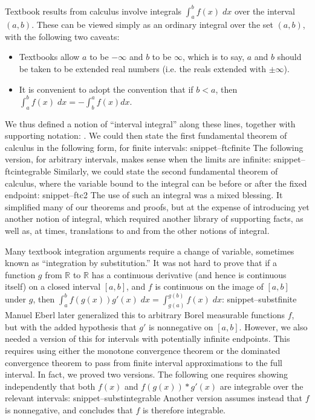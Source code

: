 \documentclass{svjour3}
\newcommand{\RR}{\mathbb{R}}
\newcommand{\Snippet}[1]{\csname snippet--#1\endcsname}
\begin{document}
Textbook results from calculus involve integrals $\int_a^b f(x) \; dx$ over the interval $(a,b)$. These can be viewed simply as an ordinary integral over the set $(a,b)$, with the following two caveats:
\begin{itemize}
 \item Textbooks allow $a$ to be $-\infty$ and $b$ to be $\infty$, which is to say, $a$ and $b$ should be taken to be extended real numbers (i.e. the reals extended with $\pm\infty$).
 \item It is convenient to adopt the convention that if $b < a$, then \\ $\int_a^b f(x) \; dx = -\int_b^a f(x) dx$.
\end{itemize}
We thus defined a notion of ``interval integral'' along these lines, together with supporting notation: . We could then state the first fundamental theorem of calculus in the following form, for finite intervals:
\Snippet{ftcfinite}
The following version, for arbitrary intervals, makes sense when the limits are infinite:
\Snippet{ftcintegrable}
Similarly, we could state the second fundamental theorem of calculus, where the variable bound to the integral can be before or after the fixed endpoint:
\Snippet{ftc2}
The use of such an integral was a mixed blessing. It simplified many of our theorems and proofs, but at the expense of introducing yet another notion of integral, which required another library of supporting facts, as well as, at times, translations to and from the other notions of integral.

Many textbook integration arguments require a change of variable, sometimes known as ``integration by substitution.'' It was not hard to prove that if a function $g$ from $\RR$ to $\RR$ has a continuous derivative (and hence is continuous itself) on a closed interval $[a,b]$, and $f$ is continuous on the image of $[a, b]$ under $g$, then $\int_a^b f(g(x)) g'(x) \; dx = \int_{g(a)}^{g(b)} f(x) \; dx$:
\Snippet{substfinite}
Manuel Eberl later generalized this to arbitrary Borel measurable functions $f$, but with the added hypothesis that $g'$ is nonnegative on $[a, b]$. However, we also needed a version of this for intervals with potentially infinite endpoints. This requires using either the monotone convergence theorem or the dominated convergence theorem to pass from finite interval approximations to the full interval. In fact, we proved two versions. The following one requires showing independently that both $f(x)$ and $f(g(x)) * g'(x)$ are integrable over the relevant intervals:
\Snippet{substintegrable}
Another version assumes instead that $f$ is nonnegative, and concludes that $f$ is therefore integrable.
\end{document}
